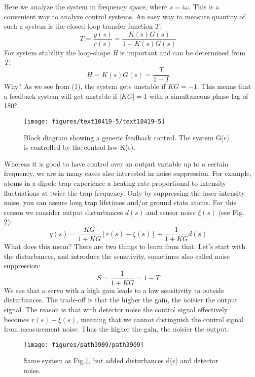 \documentclass[10pt]{article}
\begin{document}
Here we analyze the system in frequency space, where $s=i\omega$. This is a convenient way to analyze control systems.   \newline
An easy way to measure quantity of such a system is the closed-loop transfer function $T$:
\begin{equation}
T= \frac{y(s)}{r(s)} = \frac{K(s)G(s)}{1+K(s)G(s)}
\end{equation}
For system stability the loop-shape \textit{H} is important and can be determined from \textit{T}:
\begin{equation}
H = K(s)G(s) = \frac{T}{1-T}
\end{equation}
Why? As we see from (1), the system gets unstable if $KG= -1$. This means that a feedback system will get unstable if $|KG|=1$ with a simultaneous phase lag of 180°.
\begin{figure}[h!]
\begin{center}
\texttt{[image: figures/text10419-5/text10419-5]}
\caption{{Block diagram showing a generic feedback control. The system G(s) is
controlled by the control law K(s).
{\label{195696}}%
}}
\end{center}
\end{figure}

Whereas it is good to have control over an output variable up to a certain frequency, we are in many cases also interested in noise suppression. For example, atoms in a dipole trap experience a heating rate proportional to intensity fluctuations at twice the trap frequency. Only by suppressing the laser intensity noise, you can assure long trap lifetimes and/or ground state atoms. \newline
For this reason we consider output disturbances $d(s)$ and sensor noise $\xi (s)$ (see Fig. \ref{408256}):
\begin{equation}
y(s) = \frac{KG}{1+KG}[ r(s)-\xi(s)] + \frac{1}{1+KG}d(s)
\end{equation}
What does this mean? There are two things to learn from that. Let's start with the disturbances, and introduce the sensitivity, sometimes also called noise suppression:
\begin{equation}
S = \frac{1}{1+KG} = 1-T
\end{equation}
We see that a servo with a high gain leads to a low sensitivity to outside disturbances. \newline
The trade-off is that the higher the gain, the noisier the output signal. The reason is that with detector noise the control signal effectively becomes $r(s)-\xi(s)$, meaning that we cannot distinguish the control signal from measurement noise. Thus the higher the gain, the noisier the output.
\begin{figure}[h!]
\begin{center}
\texttt{[image: figures/path3909/path3909]}
\caption{{Same system as Fig.{\ref{195696}}, but added
disturbances d(s) and detector noise.
{\label{408256}}%
}}
\end{center}
\end{figure}
\end{document}
